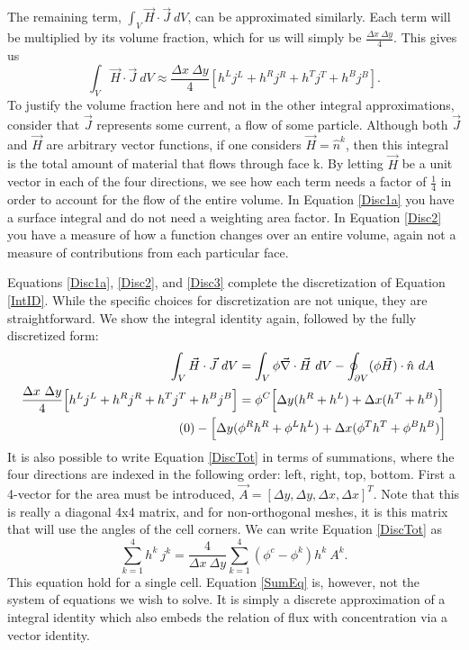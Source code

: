\documentclass[11pt,letterpaper,oneside,notitlepage]{article}	%
\newcommand{\del}{\vec\nabla}				%
\newcommand{\yestag}{\tag{\theequation}\stepcounter{equation}}	%
\newcommand{\eq}[1]{Equation \eqref{#1}}		%
\numberwithin{equation}{section}				%
\begin{document}
The remaining term, $\int_V\vec H\cdot\vec J\ dV$, can be approximated similarly. Each term will be multiplied by its volume fraction, which for us will simply be $\frac{\Delta x\ \Delta y}{4}$. This gives us
\begin{equation}
\int_V\vec H\cdot\vec J\ dV \approx \frac{\Delta x\ \Delta y}{4} [h^Lj^L+h^Rj^R+h^Tj^T+h^Bj^B]\label{Disc3}
.\end{equation}
To justify the volume fraction here and not in the other integral approximations, consider that $\vec J$ represents some current, a flow of some particle. Although both $\vec J$ and $\vec H$ are arbitrary vector functions, if one considers $\vec H = \hat n^k$, then this integral is the total amount of material that flows through face k. By letting $\vec H$ be a unit vector in each of the four directions, we see how each term needs a factor of $\frac{1}{4}$ in order to account for the flow of the entire volume. In \eq{Disc1a} you have a surface integral and do not need a weighting area factor. In \eq{Disc2} you have a measure of how a function changes over an entire volume, again not a measure of contributions from each particular face.

Equations \eqref{Disc1a}, \eqref{Disc2}, and \eqref{Disc3} complete the discretization of \eq{IntID}.  While the specific choices for discretization are not unique\cite{Morel1998}, they are straightforward.  We show the integral identity again, followed by the fully discretized form:
\begin{align*}
\int_V\vec H\cdot\vec J\ dV &= \int_V\phi\del\cdot\vec H\ dV - \oint_{\partial V}(\phi\vec H)\cdot\hat n\ dA \\
\frac{\Delta x\ \Delta y}{4} \Big[h^Lj^L+h^Rj^R+h^Tj^T+h^Bj^B\Big] &=\phi^C\Big[\Delta y (h^R + h^L) + \Delta x (h^T + h^B)\Big]\\\yestag\label{DiscTot}
-\Big[\Delta y (& \phi^R h^R + \phi^L h^L) + \Delta x (\phi^T h^T + \phi^B h^B)\Big]
\end{align*}
It is also possible to write \eq{DiscTot} in terms of summations, where the four directions are indexed in the following order: left, right, top, bottom.  First a 4-vector for the area must be introduced, $\vec A = [\Delta y, \Delta y, \Delta x, \Delta x]^T$.  Note that this is really a diagonal 4x4 matrix, and for non-orthogonal meshes, it is this matrix that will use the angles of the cell corners.
We can write \eq{DiscTot} as
\begin{equation}
\sum_{k=1}^4 h^k\ j^k=\frac{4}{\Delta x\ \Delta y}\sum_{k=1}^4\left(\phi^c-\phi^k\right)h^k\ A^k\label{SumEq}.
\end{equation}
This equation hold for a single cell. \eq{SumEq} is, however, not the system of equations we wish to solve. It is simply a discrete approximation of a integral identity which also embeds the relation of flux with concentration via a vector identity.
\end{document}
